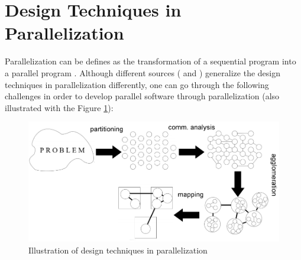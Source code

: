 \section{Design Techniques in Parallelization} 
Parallelization can be defines as the transformation of a sequential program into a parallel program \cite{springerparallel}. Although different sources (\cite{springerparallel} and \cite{lukas1}) generalize the design techniques in parallelization differently, one can go through the following challenges in order to develop parallel software through parallelization (also illustrated with the Figure \ref{fig:designtechniques}):
\begin{figure}[!ht]
	\centering
	\captionsetup{justification=centering}
	\includegraphics[width=\textwidth]{content/images/designtechniques.png}
	\caption{Illustration of design techniques in parallelization \cite{lukas1}}
	\label{fig:designtechniques}
\end{figure}

